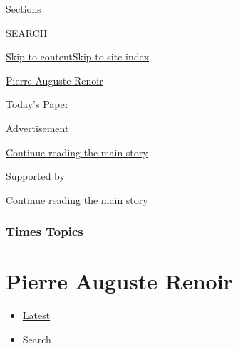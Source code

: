 Sections

SEARCH

\protect\hyperlink{site-content}{Skip to
content}\protect\hyperlink{site-index}{Skip to site index}

\href{https://www.nytimes3xbfgragh.onion/topic/person/pierre-auguste-renoir}{Pierre
Auguste Renoir}

\href{https://myaccount.nytimes3xbfgragh.onion/auth/login?response_type=cookie\&client_id=vi}{}

\href{https://www.nytimes3xbfgragh.onion/section/todayspaper}{Today's
Paper}

Advertisement

\protect\hyperlink{after-top}{Continue reading the main story}

Supported by

\protect\hyperlink{after-sponsor}{Continue reading the main story}

\hypertarget{times-topics}{%
\subsubsection{\texorpdfstring{\href{/index.html}{Times
Topics}}{Times Topics}}\label{times-topics}}

\hypertarget{pierre-auguste-renoir}{%
\section{Pierre Auguste Renoir}\label{pierre-auguste-renoir}}

\begin{itemize}
\tightlist
\item
  \protect\hyperlink{stream-panel}{Latest}
\item
  Search
\end{itemize}

